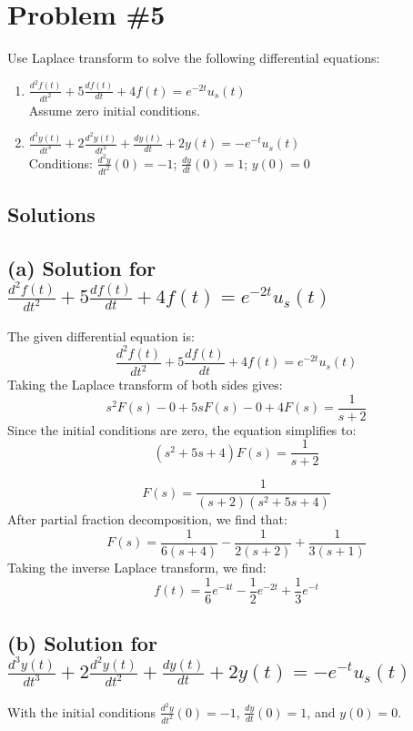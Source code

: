 \documentclass[12pt]{article}
\begin{document}
\section*{Problem \#5}
Use Laplace transform to solve the following differential equations:
\begin{enumerate}
  \item \( \frac{d^2f(t)}{dt^2} + 5 \frac{df(t)}{dt} + 4f(t) = e^{-2t} u_s(t) \) \\
  Assume zero initial conditions.

  \item \( \frac{d^3y(t)}{dt^3} + 2 \frac{d^2y(t)}{dt^2} + \frac{dy(t)}{dt} + 2y(t) = -e^{-t} u_s(t) \) \\
  Conditions: \( \frac{d^2y}{dt^2}(0) = -1 \); \( \frac{dy}{dt}(0) = 1 \); \( y(0) = 0 \)
\end{enumerate}

\subsection*{Solutions}
\subsection*{(a) Solution for \( \frac{d^2f(t)}{dt^2} + 5 \frac{df(t)}{dt} + 4f(t) = e^{-2t} u_s(t) \)}

The given differential equation is:
\[
\frac{d^2f(t)}{dt^2} + 5 \frac{df(t)}{dt} + 4f(t) = e^{-2t} u_s(t)
\]
\newline
Taking the Laplace transform of both sides gives:
\[
s^2F(s) - 0 + 5sF(s) - 0 + 4F(s) = \frac{1}{s + 2}
\]
\newline
Since the initial conditions are zero, the equation simplifies to:
\[
(s^2 + 5s + 4)F(s) = \frac{1}{s + 2}
\]

\[
F(s) = \frac{1}{(s + 2)(s^2 + 5s + 4)}
\]
\newline
After partial fraction decomposition, we find that:
\[
F(s) = \frac{1}{6(s + 4)} - \frac{1}{2(s + 2)} + \frac{1}{3(s + 1)}
\]
\newline
Taking the inverse Laplace transform, we find:
\[
f(t) = \frac{1}{6}e^{-4t} - \frac{1}{2}e^{-2t} + \frac{1}{3}e^{-t}
\]
\newpage


\subsection*{(b) Solution for \( \frac{d^3y(t)}{dt^3} + 2 \frac{d^2y(t)}{dt^2} + \frac{dy(t)}{dt} + 2y(t) = -e^{-t} u_s(t) \)}
With the initial conditions \( \frac{d^2y}{dt^2}(0) = -1 \), \( \frac{dy}{dt}(0) = 1 \), and \( y(0) = 0 \).
\end{document}
